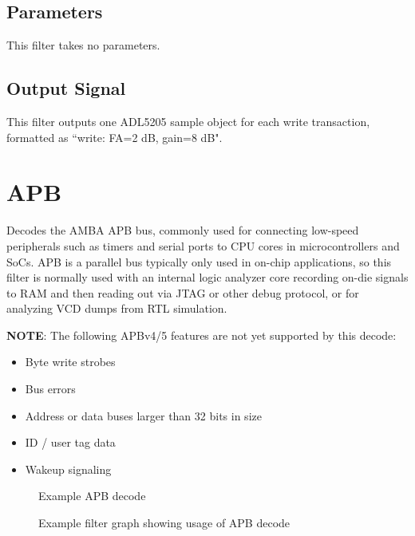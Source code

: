 \subsection{Parameters}

This filter takes no parameters.

\subsection{Output Signal}

This filter outputs one ADL5205 sample object for each write transaction, formatted as ``write: FA=2 dB, gain=8 dB".

\pagebreak
\section{APB}
\label{filter:apb}

Decodes the AMBA APB bus, commonly used for connecting low-speed peripherals such as timers and serial ports to CPU
cores in microcontrollers and SoCs. APB is a parallel bus typically only used in on-chip applications, so this filter
is normally used with an internal logic analyzer core recording on-die signals to RAM and then reading out via JTAG or
other debug protocol, or for analyzing VCD dumps from RTL simulation.

\textbf{NOTE}: The following APBv4/5 features are not yet supported by this decode:
\begin{itemize}
\item Byte write strobes
\item Bus errors
\item Address or data buses larger than 32 bits in size
\item ID / user tag data
\item Wakeup signaling
\end{itemize}

\begin{figure}[h]
\centering
{}
\caption{Example APB decode}
\label{filter_apb}
\end{figure}

\begin{figure}[h]
\centering
{}
\caption{Example filter graph showing usage of APB decode}
\label{filter_graph_apb}
\end{figure}

